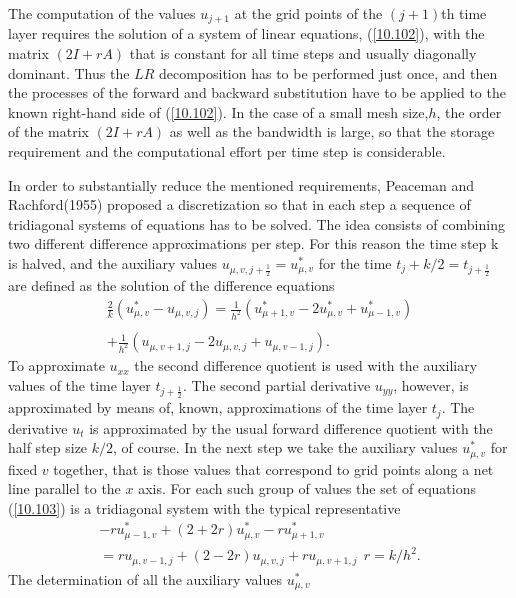 \documentclass[11pt]{article}
\begin{document}
The computation of the values $u_{j+1}$ at the grid points of the
$(j+1)$th time layer requires the solution of a system of linear
equations, (\ref{10.102}), with the matrix $(2I+rA)$ that is constant
for all time steps and usually diagonally dominant. Thus the $LR$
decomposition has to be performed just once, and then the processes of
the forward and backward substitution have to be applied to the known
right-hand side of (\ref{10.102}). In the case of a small mesh
size,$h$, the order of the matrix $(2I+rA)$ as well as the bandwidth
is large, so that the storage requirement and the computational effort
per time step is considerable.

In order to substantially reduce the mentioned requirements, Peaceman
and Rachford(1955) proposed a discretization so that in each step a
sequence of tridiagonal systems of equations has to be solved. The
idea consists of combining two different difference approximations per
step. For this reason the time step k is halved, and the auxiliary
values $u_{\mu,v,j+\frac{1}{2}} = u_{\mu,v}^\ast$ for the time $t_j+k/2 =
t_{j+\frac{1}{2}}$ are defined as the solution of the difference equations
\begin{eqnarray}
\frac{2}{k}(u_{\mu,v}^\ast - u_{\mu,v,j}) =
\frac{1}{h^2}(u_{\mu+1,v}^\ast - 2u_{\mu,v}^\ast + u_{\mu-1,v}^\ast)
\nonumber \\ \\ + \frac{1}{h^2}(u_{\mu,v+1,j} - 2u_{\mu,v,j} + u_{\mu,v-1,j}).
\nonumber \label{10.103}
\end{eqnarray}
To approximate $u_{xx}$ the second difference quotient is used with
the auxiliary values of the time layer $t_{j+\frac{1}{2}}$. The second
partial derivative $u_{yy}$, however, is approximated by means of,
known, approximations of the time layer $t_j$. The derivative $u_t$ is
approximated by the usual forward difference quotient with the half
step size $k/2$, of course. In the next step we take the auxiliary
values $u_{\mu,v}^\ast$ for fixed $v$ together, that is those values
that correspond to grid points along a net line parallel to the $x$
axis. For each such group of values the set of equations
(\ref{10.103}) is a tridiagonal system with the typical
representative
\begin{eqnarray}
-ru_{\mu-1,v}^\ast+(2+2r)u_{\mu,v}^\ast-ru_{\mu+1,v}^\ast \nonumber
 \\ = ru_{\mu,v-1,j}+(2-2r)u_{\mu,v,j}+ru_{\mu,v+1,j} \ \ r = k/h^2.
\label{10.104} 
\end{eqnarray}
The determination of all the auxiliary values $u_{\mu,v}^\ast$
\end{document}
